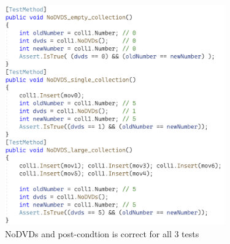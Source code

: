 \documentclass[a4paper]{article}
\begin{document}
\begin{figure}[H]
    \includegraphics[height=9.5cm]{data/NoDVDs-code.png}
    \caption{NoDVDs and post-condtion is correct for all 3 tests}
\end{figure}
\end{document}
